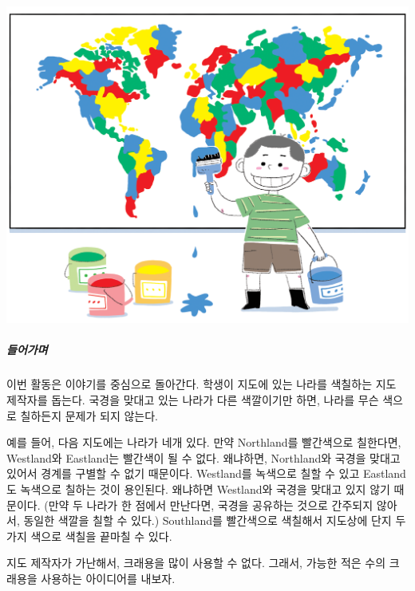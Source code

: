 \documentclass[]{article}
\begin{document}
\includegraphics{csunplugged/04-part/img/ch14-coloring/13-coloring-01-painter.png}

\subparagraph{들어가며}\label{section-188}

이번 활동은 이야기를 중심으로 돌아간다. 학생이 지도에 있는 나라를
색칠하는 지도 제작자를 돕는다. 국경을 맞대고 있는 나라가 다른 색깔이기만
하면, 나라를 무슨 색으로 칠하든지 문제가 되지 않는다.

예를 들어, 다음 지도에는 나라가 네개 있다. 만약 Northland를 빨간색으로
칠한다면, Westland와 Eastland는 빨간색이 될 수 없다. 왜냐하면,
Northland와 국경을 맞대고 있어서 경계를 구별할 수 없기 때문이다.
Westland를 녹색으로 칠할 수 있고 Eastland도 녹색으로 칠하는 것이
용인된다. 왜냐하면 Westland와 국경을 맞대고 있지 않기 때문이다. (만약 두
나라가 한 점에서 만난다면, 국경을 공유하는 것으로 간주되지 않아서,
동일한 색깔을 칠할 수 있다.) Southland를 빨간색으로 색칠해서 지도상에
단지 두가지 색으로 색칠을 끝마칠 수 있다.

지도 제작자가 가난해서, 크래용을 많이 사용할 수 없다. 그래서, 가능한
적은 수의 크래용을 사용하는 아이디어를 내보자.
\end{document}
